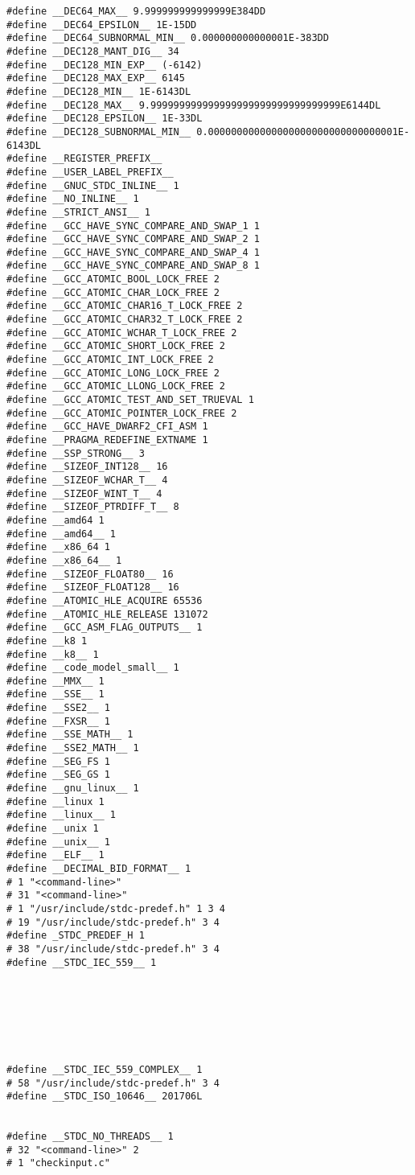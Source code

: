 \documentclass[11pt]{article}
\begin{document}
\begin{verbatim}
#define __DEC64_MAX__ 9.999999999999999E384DD
#define __DEC64_EPSILON__ 1E-15DD
#define __DEC64_SUBNORMAL_MIN__ 0.000000000000001E-383DD
#define __DEC128_MANT_DIG__ 34
#define __DEC128_MIN_EXP__ (-6142)
#define __DEC128_MAX_EXP__ 6145
#define __DEC128_MIN__ 1E-6143DL
#define __DEC128_MAX__ 9.999999999999999999999999999999999E6144DL
#define __DEC128_EPSILON__ 1E-33DL
#define __DEC128_SUBNORMAL_MIN__ 0.000000000000000000000000000000001E-6143DL
#define __REGISTER_PREFIX__ 
#define __USER_LABEL_PREFIX__ 
#define __GNUC_STDC_INLINE__ 1
#define __NO_INLINE__ 1
#define __STRICT_ANSI__ 1
#define __GCC_HAVE_SYNC_COMPARE_AND_SWAP_1 1
#define __GCC_HAVE_SYNC_COMPARE_AND_SWAP_2 1
#define __GCC_HAVE_SYNC_COMPARE_AND_SWAP_4 1
#define __GCC_HAVE_SYNC_COMPARE_AND_SWAP_8 1
#define __GCC_ATOMIC_BOOL_LOCK_FREE 2
#define __GCC_ATOMIC_CHAR_LOCK_FREE 2
#define __GCC_ATOMIC_CHAR16_T_LOCK_FREE 2
#define __GCC_ATOMIC_CHAR32_T_LOCK_FREE 2
#define __GCC_ATOMIC_WCHAR_T_LOCK_FREE 2
#define __GCC_ATOMIC_SHORT_LOCK_FREE 2
#define __GCC_ATOMIC_INT_LOCK_FREE 2
#define __GCC_ATOMIC_LONG_LOCK_FREE 2
#define __GCC_ATOMIC_LLONG_LOCK_FREE 2
#define __GCC_ATOMIC_TEST_AND_SET_TRUEVAL 1
#define __GCC_ATOMIC_POINTER_LOCK_FREE 2
#define __GCC_HAVE_DWARF2_CFI_ASM 1
#define __PRAGMA_REDEFINE_EXTNAME 1
#define __SSP_STRONG__ 3
#define __SIZEOF_INT128__ 16
#define __SIZEOF_WCHAR_T__ 4
#define __SIZEOF_WINT_T__ 4
#define __SIZEOF_PTRDIFF_T__ 8
#define __amd64 1
#define __amd64__ 1
#define __x86_64 1
#define __x86_64__ 1
#define __SIZEOF_FLOAT80__ 16
#define __SIZEOF_FLOAT128__ 16
#define __ATOMIC_HLE_ACQUIRE 65536
#define __ATOMIC_HLE_RELEASE 131072
#define __GCC_ASM_FLAG_OUTPUTS__ 1
#define __k8 1
#define __k8__ 1
#define __code_model_small__ 1
#define __MMX__ 1
#define __SSE__ 1
#define __SSE2__ 1
#define __FXSR__ 1
#define __SSE_MATH__ 1
#define __SSE2_MATH__ 1
#define __SEG_FS 1
#define __SEG_GS 1
#define __gnu_linux__ 1
#define __linux 1
#define __linux__ 1
#define __unix 1
#define __unix__ 1
#define __ELF__ 1
#define __DECIMAL_BID_FORMAT__ 1
# 1 "<command-line>"
# 31 "<command-line>"
# 1 "/usr/include/stdc-predef.h" 1 3 4
# 19 "/usr/include/stdc-predef.h" 3 4
#define _STDC_PREDEF_H 1
# 38 "/usr/include/stdc-predef.h" 3 4
#define __STDC_IEC_559__ 1







#define __STDC_IEC_559_COMPLEX__ 1
# 58 "/usr/include/stdc-predef.h" 3 4
#define __STDC_ISO_10646__ 201706L


#define __STDC_NO_THREADS__ 1
# 32 "<command-line>" 2
# 1 "checkinput.c"


\end{verbatim}
\end{document}

